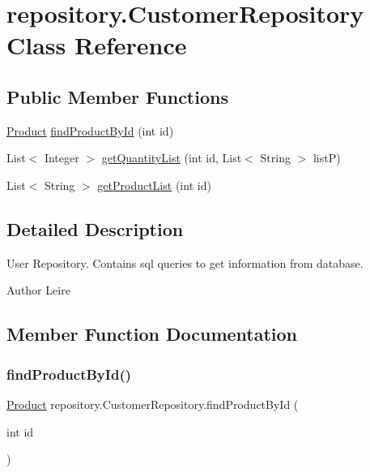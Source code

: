 \hypertarget{classrepository_1_1_customer_repository}{}\section{repository.\+Customer\+Repository Class Reference}
\label{classrepository_1_1_customer_repository}
\subsection*{Public Member Functions}
\begin{DoxyCompactItemize}
\item 
\mbox{\hyperlink{classentity_1_1_product}{Product}} \mbox{\hyperlink{classrepository_1_1_customer_repository_ae640f52235917c0cc786c4a589f66298}{find\+Product\+By\+Id}} (int id)
\item 
List$<$ Integer $>$ \mbox{\hyperlink{classrepository_1_1_customer_repository_aaf10d05eb98d9995edda61c3fe5e04f2}{get\+Quantity\+List}} (int id, List$<$ String $>$ listP)
\item 
List$<$ String $>$ \mbox{\hyperlink{classrepository_1_1_customer_repository_a18f31c471b0a4adfacd1ea23499cb02b}{get\+Product\+List}} (int id)
\end{DoxyCompactItemize}


\subsection{Detailed Description}
User Repository. Contains sql queries to get information from database.

\begin{DoxyAuthor}{Author}
Leire 
\end{DoxyAuthor}


\subsection{Member Function Documentation}
\mbox{\label{classrepository_1_1_customer_repository_ae640f52235917c0cc786c4a589f66298}} 
\subsubsection{\texorpdfstring{find\+Product\+By\+Id()}{findProductById()}}
{\footnotesize\ttfamily \mbox{\hyperlink{classentity_1_1_product}{Product}} repository.\+Customer\+Repository.\+find\+Product\+By\+Id (\begin{DoxyParamCaption}\item[{int}]{id }\end{DoxyParamCaption})\hspace{0.3cm}{\ttfamily [inline]}}

